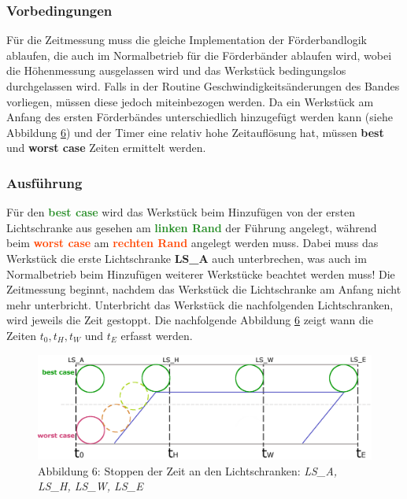 \documentclass[a4paper, 11pt]{article}
\begin{document}
\subsubsection{Vorbedingungen}
Für die Zeitmessung muss die gleiche Implementation der Förderbandlogik ablaufen, die auch im Normalbetrieb für die Förderbänder ablaufen wird, wobei die Höhenmessung ausgelassen wird und das Werkstück bedingungslos durchgelassen wird. Falls in der Routine Geschwindigkeitsänderungen des Bandes vorliegen, müssen diese jedoch miteinbezogen werden.
Da ein Werkstück am Anfang des ersten Förderbändes unterschiedlich hinzugefügt werden kann (siehe Abbildung \hyperref[sec:Messpunkte]{6}) und der Timer eine relativ hohe Zeitauflösung hat, müssen \textbf{best} und \textbf{worst case} Zeiten ermittelt werden. 

\subsubsection{Ausführung}
Für den \textbf{\textcolor{ForestGreen}{best case}} wird das Werkstück beim Hinzufügen von der ersten Lichtschranke aus gesehen am \textbf{\textcolor{ForestGreen}{linken Rand}} der Führung angelegt, während beim \textbf{\textcolor{OrangeRed}{worst case}} am \textbf{\textcolor{OrangeRed}{rechten Rand}} angelegt werden muss. Dabei muss das Werkstück die erste Lichtschranke \textbf{LS\_A} auch unterbrechen, was auch im Normalbetrieb beim Hinzufügen weiterer Werkstücke beachtet werden muss! Die Zeitmessung beginnt, nachdem das Werkstück die Lichtschranke am Anfang nicht mehr unterbricht. Unterbricht das Werkstück die nachfolgenden Lichtschranken, wird jeweils die Zeit gestoppt. Die nachfolgende Abbildung \hyperref[sec:Messpunkte]{6} zeigt wann die Zeiten $t_0, t_H, t_W$ und $t_E$ erfasst werden.

\begin{figure}[h]
\centering 
    \includegraphics[scale=0.6]{images/Zeitmessung_Platzierung.png}
    \caption*{Abbildung 6: Stoppen der Zeit an den Lichtschranken: \textit{LS\_A, LS\_H, LS\_W, LS\_E}}
    \label{sec:Messpunkte}
\end{figure}
\end{document}
